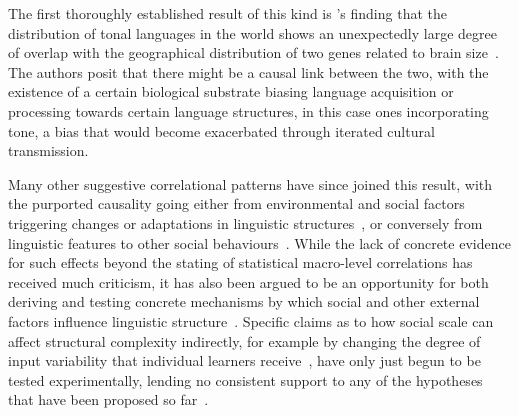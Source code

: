 The first thoroughly established result of this kind is \citeauthor{Dediu2007}'s finding that the distribution of tonal languages in the world shows an unexpectedly large degree of overlap with the geographical distribution of two genes related to brain size~\citeyear{Dediu2007}. The authors posit that there might be a causal link between the two, with the existence of a certain biological substrate biasing language acquisition or processing towards certain language structures, in this case ones incorporating tone, a bias that would become exacerbated through iterated cultural transmission.

Many other suggestive correlational patterns have since joined this result, with the purported causality going either from environmental and social factors triggering changes or adaptations in linguistic structures~\citep{Lupyan2010}, or conversely from linguistic features to other social behaviours~\citep{Chen2013}. While the lack of concrete evidence for such effects beyond the stating of statistical macro-level correlations has received much criticism, it has also been argued to be an opportunity for both deriving and testing concrete mechanisms by which social and other external factors influence linguistic structure~\citep{Roberts2012,Nettle2012,Roberts2013correlation}. Specific claims as to how social scale can affect structural complexity indirectly, for example by changing the degree of input variability that individual learners receive~\citep{Wray2007}, have only just begun to be tested experimentally, lending no consistent support to any of the hypotheses that have been proposed so far~\citep{Atkinson2016}.




